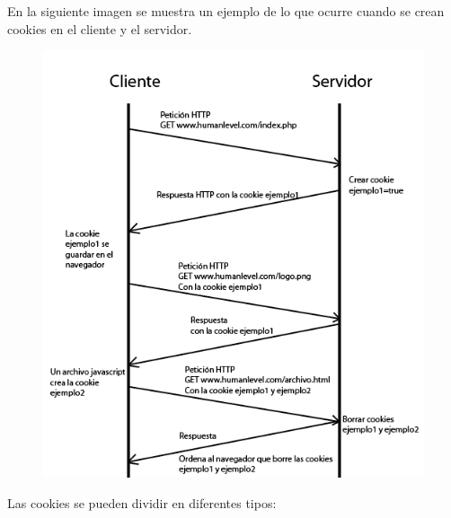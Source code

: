 \documentclass[a4paper,12pt]{article}
\begin{document}
\begin{enumerate}
 En la siguiente imagen se muestra un ejemplo de lo que ocurre cuando se crean cookies en el cliente y el servidor.
 
 \begin{figure}[H]
  \centering
  \includegraphics[scale = 0.5]{3.png}
 \end{figure}

 Las cookies se pueden dividir en diferentes tipos:
 

\end{enumerate}
\end{document}

